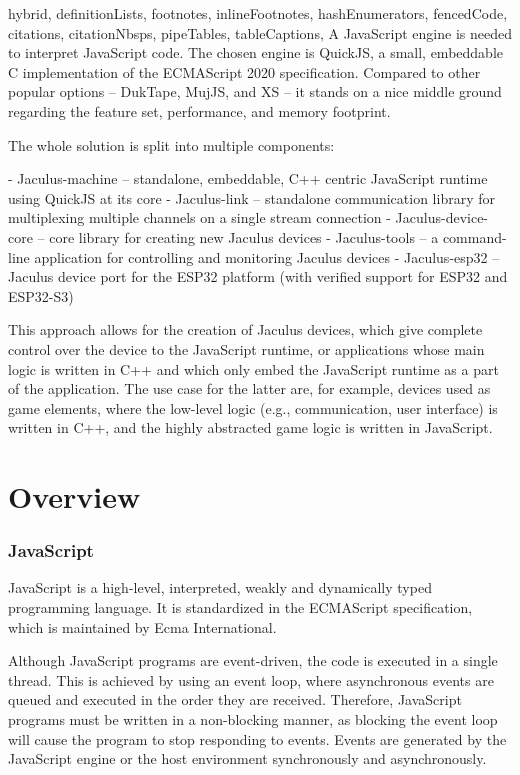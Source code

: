 \documentclass[
  digital,
  oneside,
  nosansbold,
  nocolorbold,
  lof,
  lot
]{fithesis4}
\begin{document}
\begin{markdown*}{%
  hybrid,
  definitionLists,
  footnotes,
  inlineFootnotes,
  hashEnumerators,
  fencedCode,
  citations,
  citationNbsps,
  pipeTables,
  tableCaptions,
}
A JavaScript engine is needed to interpret JavaScript code. The chosen engine is QuickJS, a small, embeddable C implementation of the ECMAScript 2020 specification. Compared to other popular options -- DukTape, MujJS, and XS -- it stands on a nice middle ground regarding the feature set, performance, and memory footprint.

The whole solution is split into multiple components:

  - Jaculus-machine -- standalone, embeddable, C++ centric JavaScript runtime using QuickJS at its core
  - Jaculus-link -- standalone communication library for multiplexing multiple channels on a single stream connection
  - Jaculus-device-core -- core library for creating new Jaculus devices
  - Jaculus-tools -- a command-line application for controlling and monitoring Jaculus devices
  - Jaculus-esp32 -- Jaculus device port for the ESP32 platform (with verified support for ESP32 and ESP32-S3)

This approach allows for the creation of Jaculus devices, which give complete control over the device to the JavaScript runtime, or applications whose main logic is written in C++ and which only embed the JavaScript runtime as a part of the application. The use case for the latter are, for example, devices used as game elements, where the low-level logic (e.g., communication, user interface) is written in C++, and the highly abstracted game logic is written in JavaScript.


\chapter{Overview}

\subsection{JavaScript}

JavaScript is a high-level, interpreted, weakly and dynamically typed programming language. It is standardized in the ECMAScript specification, which is maintained by Ecma International.

Although JavaScript programs are event-driven, the code is executed in a single thread. This is achieved by using an event loop, where asynchronous events are queued and executed in the order they are received. Therefore, JavaScript programs must be written in a non-blocking manner, as blocking the event loop will cause the program to stop responding to events. Events are generated by the JavaScript engine or the host environment synchronously and asynchronously.



\end{markdown*}
\end{document}
